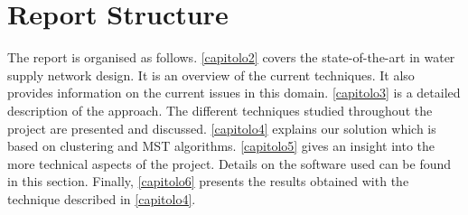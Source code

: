 \section{Report Structure}
The report is organised as follows.
\ref{capitolo2} covers the state-of-the-art in water supply network design. It is an overview of the
current techniques. It also provides information on the current issues in this domain.
\ref{capitolo3} is a detailed description of the approach. The different techniques studied throughout 
the project are
presented and discussed.
\ref{capitolo4} explains our solution which is based on clustering and MST algorithms.
\ref{capitolo5} gives an insight into the more technical aspects of the project. Details on the software used
can be found in this section.
Finally, \ref{capitolo6} presents the results obtained with the technique described in \ref{capitolo4}.




